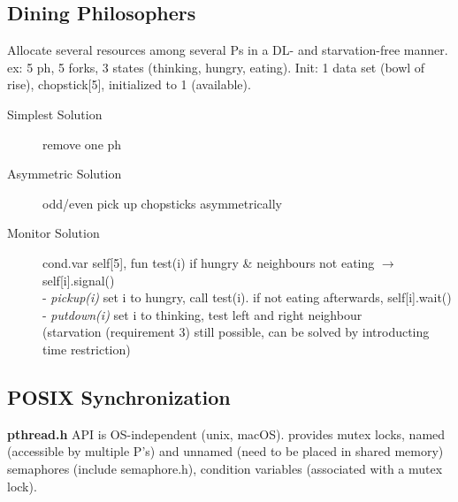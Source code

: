 \subsection*{Dining Philosophers}
Allocate several resources among several Ps in a DL- and starvation-free manner. ex: 5 ph, 5 forks, 3 states (thinking, hungry, eating). Init: 1 data set (bowl of rise), chopstick[5], initialized to 1 (available).
\begin{description}
    \item[Simplest Solution] remove one ph %
    \item[Asymmetric Solution] odd/even pick up chopsticks asymmetrically
    \item[Monitor Solution]cond.var self[5], fun test(i) if hungry \& neighbours not eating $\rightarrow$ self[i].signal() \\
        - \textit{pickup(i)} set i to hungry, call test(i). if not eating afterwards, self[i].wait() \\
        - \textit{putdown(i)} set i to thinking, test left and right neighbour \\
        (starvation (requirement 3) still possible, can be solved by introducting time restriction)
\end{description}

\subsection*{POSIX Synchronization}
    \textbf{pthread.h} API is OS-independent (unix, macOS). provides mutex locks, named (accessible by multiple P's) and unnamed (need to be placed in shared memory) semaphores (include semaphore.h), condition variables (associated with a mutex lock).

